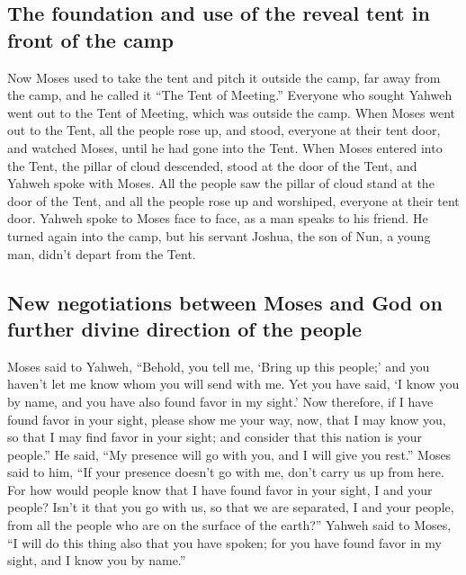 \hypertarget{the-foundation-and-use-of-the-reveal-tent-in-front-of-the-camp}{%
\subsection{The foundation and use of the reveal tent in front of the
camp}\label{the-foundation-and-use-of-the-reveal-tent-in-front-of-the-camp}}

 Now Moses used to take the tent and pitch it outside the
camp, far away from the camp, and he called it ``The Tent of Meeting.''
Everyone who sought Yahweh went out to the Tent of Meeting, which was
outside the camp.  When Moses went out to the Tent, all
the people rose up, and stood, everyone at their tent door, and watched
Moses, until he had gone into the Tent.  When Moses
entered into the Tent, the pillar of cloud descended, stood at the door
of the Tent, and Yahweh spoke with Moses.  All the people
saw the pillar of cloud stand at the door of the Tent, and all the
people rose up and worshiped, everyone at their tent door.
 Yahweh spoke to Moses face to face, as a man speaks to
his friend. He turned again into the camp, but his servant Joshua, the
son of Nun, a young man, didn't depart from the Tent.

\hypertarget{new-negotiations-between-moses-and-god-on-further-divine-direction-of-the-people}{%
\subsection{New negotiations between Moses and God on further divine
direction of the
people}\label{new-negotiations-between-moses-and-god-on-further-divine-direction-of-the-people}}

 Moses said to Yahweh, ``Behold, you tell me, `Bring up
this people;' and you haven't let me know whom you will send with me.
Yet you have said, `I know you by name, and you have also found favor in
my sight.'  Now therefore, if I have found favor in your
sight, please show me your way, now, that I may know you, so that I may
find favor in your sight; and consider that this nation is your
people.''  He said, ``My presence will go with you, and I
will give you rest.''  Moses said to him, ``If your
presence doesn't go with me, don't carry us up from here.
 For how would people know that I have found favor in
your sight, I and your people? Isn't it that you go with us, so that we
are separated, I and your people, from all the people who are on the
surface of the earth?''  Yahweh said to Moses, ``I will
do this thing also that you have spoken; for you have found favor in my
sight, and I know you by name.''

